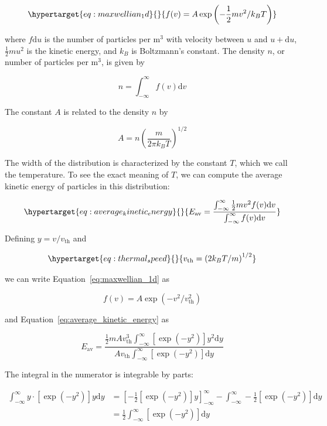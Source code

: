 \documentclass[
  notoc %
]{tufte-book}
\begin{document}
\begin{equation}\protect\hypertarget{eq:maxwellian_1d}{}{
f(v) = A \exp\left( -\frac{1}{2}mv^2/k_B T \right)
}\label{eq:maxwellian_1d}\end{equation}

where \(f\mathrm{d}u\) is the number of particles per \(\text{m}^3\)
with velocity between \(u\) and \(u+\mathrm{d}u\), \(\frac{1}{2}mu^2\)
is the kinetic energy, and \(k_B\) is Boltzmann's constant. The density
\(n\), or number of particles per \(\text{m}^3\), is given by

\[
n = \int_{-\infty}^\infty f(v)\mathrm{d}v
\]

The constant \(A\) is related to the density \(n\) by

\[
A = n\left( \frac{m}{2\pi k_B T} \right)^{1/2}
\]

The width of the distribution is characterized by the constant \(T\),
which we call the temperature. To see the exact meaning of \(T\), we can
compute the average kinetic energy of particles in this distribution:

\begin{equation}\protect\hypertarget{eq:average_kinetic_energy}{}{
E_\text{av} = \frac{\int_{-\infty}^\infty \frac{1}{2}mv^2f(v)\mathrm{d}v}{\int_{-\infty}^\infty f(v)\mathrm{d}v}
}\label{eq:average_kinetic_energy}\end{equation}

Defining \(y=v/v_\text{th}\) and

\begin{equation}\protect\hypertarget{eq:thermal_speed}{}{
v_\text{th} = \left( 2k_B T/m \right)^{1/2}
}\label{eq:thermal_speed}\end{equation}

we can write Equation~\ref{eq:maxwellian_1d} as

\[
f(v) = A \exp(-v^2/v_\text{th}^2)
\]

and Equation~\ref{eq:average_kinetic_energy} as

\[
E_\text{av} = \frac{\frac{1}{2}mA v_\text{th}^3 \int_{-\infty}^\infty [\exp(-y^2)]y^2\mathrm{d}y}{A v_\text{th}\int_{-\infty}^\infty [\exp(-y^2)]\mathrm{d}y}
\]

The integral in the numerator is integrable by parts:

\[
\begin{aligned}
\int_{-\infty}^\infty y\cdot[\exp(-y^2)]y\mathrm{d}y &= \left[ -\frac{1}{2}[\exp(-y^2)]y \right]_{-\infty}^\infty -\int_{-\infty}^\infty -\frac{1}{2}[\exp(-y^2)]\mathrm{d}y \\
&= \frac{1}{2}\int_{-\infty}^\infty [\exp(-y^2)]\mathrm{d}y
\end{aligned}
\]
\end{document}
